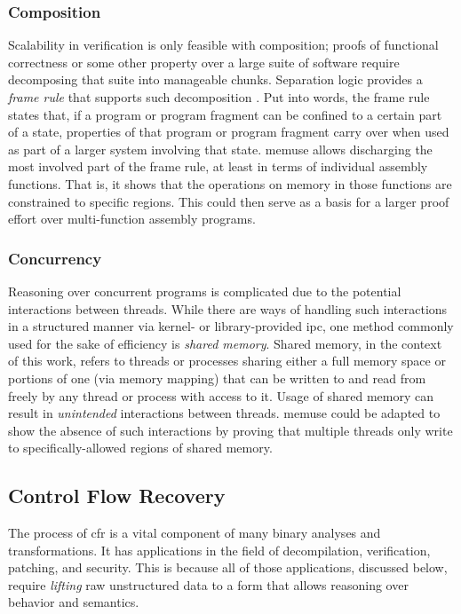 \subsubsection{Composition}\label{sse:composition}
Scalability in verification is only feasible with composition; proofs of functional correctness or some other property over a large suite of software require decomposing that suite into manageable chunks.
Separation logic provides a \emph{frame rule} that supports such%
decomposition \autocite{o2001local,reynolds2002separation,krebbers2017essence}.
Put into words, the frame rule states that,
if a program or program fragment can be confined to a certain part of a state, properties of that program or program fragment carry over when used as part of a larger system involving that state.
\Gls{memuse} allows discharging the most involved part of the frame rule, at least in terms of individual assembly functions.
That is, it shows that the operations on memory in those functions are constrained to specific regions.
This could then serve as a basis for a larger proof effort over multi-function assembly programs.

\subsubsection{Concurrency}
Reasoning over concurrent programs is complicated due to the potential interactions between threads.
While there are ways of handling such interactions in a structured manner via kernel- or library-provided \gls{ipc}, one method commonly used for the sake of efficiency is \emph{shared memory}.
Shared memory, in the context of this work, refers to threads or processes sharing either a full memory space or portions of one (via memory mapping) that can be written to and read from freely by any thread or process with access to it.
Usage of shared memory can result in \emph{unintended} interactions between threads.
\Gls{memuse} could be adapted to show the absence of such interactions by proving that multiple threads only write to specifically-allowed regions of shared memory.

\subsection{Control Flow Recovery}
The process of \gls{cfr} is a vital component of many binary analyses and transformations. It has applications in the field of decompilation, verification, patching, and security.
This is because all of those applications, discussed below, require \emph{lifting} raw unstructured data to a form that allows reasoning over behavior and semantics.

